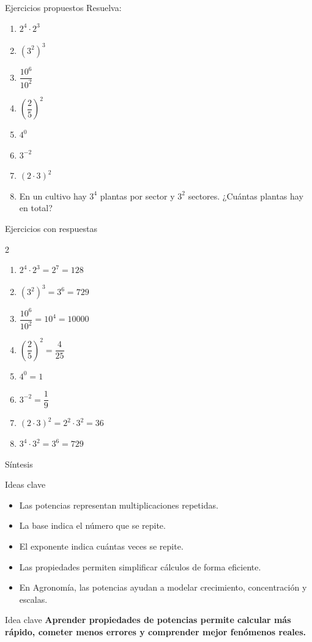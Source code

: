 \documentclass[aspectratio=169,10pt,handout]{beamer}
\newcommand{\pp}{\pause}
\newenvironment{ideaBox}
{\begin{exampleblock}{Idea clave}}
	{\end{exampleblock}}
\begin{document}
	\begin{frame}{Ejercicios propuestos}
		Resuelva:
		\begin{enumerate}
			\item \(2^4\cdot2^3\)
			\item \((3^2)^3\)
			\item \(\dfrac{10^6}{10^2}\)
			\item \(\left(\dfrac{2}{5}\right)^2\)
			\item \(4^0\)
			\item \(3^{-2}\)
			\item \((2\cdot3)^2\)
			\item En un cultivo hay \(3^4\) plantas por sector y \(3^2\) sectores. ¿Cuántas plantas hay en total?
		\end{enumerate}
	\end{frame}
	
	\begin{frame}{Ejercicios con respuestas}
		\begin{multicols}{2}
			\begin{enumerate}
				\item \(2^4\cdot2^3=2^7=128\)
				\item \((3^2)^3=3^6=729\)
				\item \(\dfrac{10^6}{10^2}=10^4=10000\)
				\item \(\left(\dfrac{2}{5}\right)^2=\dfrac{4}{25}\)
				\item \(4^0=1\)
				\item \(3^{-2}=\dfrac{1}{9}\)
				\item \((2\cdot3)^2=2^2\cdot3^2=36\)
				\item \(3^4\cdot3^2=3^6=729\)
			\end{enumerate}
		\end{multicols}
	\end{frame}
	
	\begin{frame}{Síntesis}
		\begin{block}{Ideas clave}
			\begin{itemize}
				\item Las potencias representan multiplicaciones repetidas.
				\item La base indica el número que se repite.
				\item El exponente indica cuántas veces se repite.
				\item Las propiedades permiten simplificar cálculos de forma eficiente.
				\item En Agronomía, las potencias ayudan a modelar crecimiento, concentración y escalas.
			\end{itemize}
		\end{block}
		
		\pp
		
		\begin{ideaBox}
			\centering
			\textbf{Aprender propiedades de potencias permite calcular más rápido, cometer menos errores y comprender mejor fenómenos reales.}
		\end{ideaBox}
	\end{frame}
	
\end{document}
